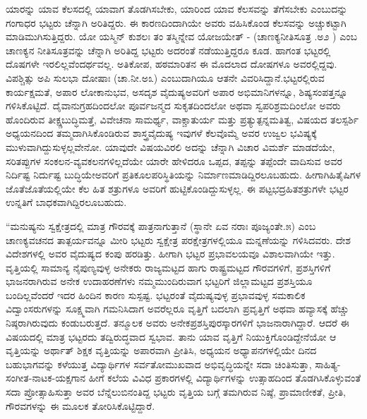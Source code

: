 {ಯಾರನ್ನು ಯಾವ ಕೆಲಸದಲ್ಲಿ ಯಾವಾಗ ತೊಡಗಿಸಬೇಕು, ಯಾರಿಂದ ಯಾವ ಕೆಲಸವನ್ನು ತೆಗೆಸಬೇಕು  ಎಂಬುದನ್ನು ಗಂಗಾಧರ ಭಟ್ಟರು ಚೆನ್ನಾಗಿ ಅರಿತಿದ್ದರು. ಈ ಕಾರಣದಿಂದಾಗಿಯೇ ಅವರು ವಹಿಸಿಕೊಂಡ ಕೆಲಸವನ್ನು ಅಚ್ಚುಕಟ್ಟಾಗಿ ಮಾಡಿಮುಗಿಸುತ್ತಿದ್ದರು. ಯೋ ಯಸ್ಮಿನ್ ಕುಶಲಃ ತಂ ತಸ್ಮಿನ್ನೇವ ಯೋಜಯೇತ್ - (ಚಾಣಕ್ಯನೀತಿಸೂತ್ರ .ಅ\enginline{-}೨ ) ಎಂಬ ಚಾಣಕ್ಯನ ನೀತಿಸೂತ್ರವನ್ನು ಚೆನ್ನಾಗಿ ಅರಿತಿದ್ದ ಭಟ್ಟರು ಅದರಂತೆ  ನಡೆಯುತ್ತಿದ್ದರೂ ಕೂಡ. ಹಾಗಂತ ಭಟ್ಟರಲ್ಲಿ ದೊಷಗಳೇ ಇರಲಿಲ್ಲವೆಂದರ್ಥವಲ್ಲ. ಅತಿಕೋಪ, ಹಠಮಾರಿತನ ಈ ಮೊದಲಾದ ದೋಷಗಳೂ ಅವರಲ್ಲಿದ್ದವು. ವಿಪಶ್ಚಿತ್ಸು ಅಪಿ ಸುಲಭಾ ದೋಷಾಃ (ಚಾ.ನೀ.\enginline{-}ಅ\enginline{-}೩) ಎಂಬುದಾಗಿಯೂ ಆತನೇ ವಿವರಿಸಿದ್ದಾನೆ.\break ಭಟ್ಟರಲ್ಲಿರುವ ಕಾರ್ಯಕ್ಷಮತೆ, ಅಪಾರ ಲೋಕಾನುಭವ, ಅಸದೃಶ ವೈದುಷ್ಯ\break ಅವರಿಗೆ ಅಪಾರ ಅಭಿಮಾನಿಗಳನ್ನೂ, ಶಿಷ್ಯಸಂಪತ್ತನ್ನೂ ಗಳಿಸಿಕೊಟ್ಟಿದೆ. ದೈವಾನುಗ್ರಹ\-ದಿಂದಲೋ  ಪೂರ್ವಜನ್ಮದ ಸುಕೃತದಿಂದಲೋ ಅಥವಾ ಸ್ವಪರಿಶ್ರಮದಿಂಲೋ ಅವರು ಹೊಂದಿರುವ ತೀಕ್ಷ್ಣಬುದ್ಧಿಮತ್ತೆ, ವಿವೇಚನಾ ಸಾಮರ್ಥ್ಯ, ವಾಕ್ಚಾತುರ್ಯ ಮತ್ತು ಪ್ರತ್ಯುತ್ಪನ್ನಮತಿತ್ವ, ವಿಷಯದ ತಲಸ್ಪರ್ಶಿ ಅಧ್ಯಯನದಿಂದ ತಮ್ಮದಾಗಿಸಿಕೊಂಡಿರುವ ಶಾಸ್ತ್ರವೈದುಷ್ಯ ಇವುಗಳೆ ಕೆಲವೊಮ್ಮೆ ಅವರ ಉಜ್ವಲ ಭವಿಷ್ಯಕ್ಕೆ ಮುಳುವಾಗಿದ್ದು\break ಸುಳ್ಳಲ್ಲವೇನೋ. ಯಾವುದೇ ವಿಷಯವಿರಲಿ ಅದನ್ನು ಚೆನ್ನಾಗಿ ವಿಚಾರ \enginline{-} ವಿಮರ್ಶೆ ಮಾಡದೆಯೇ, ಸರಿತಪ್ಪುಗಳ ಸಂಕಲನ-ವ್ಯವಕಲನಗಳಿಲ್ಲದೆಯೇ ಯಾರೇ ಹೇಳಿದರೂ ಒಪ್ಪದ, ತಪ್ಪನ್ನು ತಪ್ಪೆಂದೇ ವಾದಿಸುವ ಅವರ ನಿರ್ದಿಷ್ಟ \enginline{-} ನಿರ್ದುಷ್ಟ ಬುದ್ಧಿಯೇ\break ಅವರಿಗೆ ಪ್ರತಿಕೂಲ\-ಪರಿಸ್ಥಿತಿಯನ್ನು ನಿರ್ಮಾಣಮಾಡಿದ್ದಿರಲೂಬಹುದು. ಹೀಗಾಗಿ\break  ಹಿತೈಷಿಗಳ ಜೊತೆಜೊತೆಯಲ್ಲಿಯೇ ಕೆಲ ಹಿತ ಶತ್ರುಗಳೂ ಅವರಿಗೆ ಹುಟ್ಟಿಕೊಂಡಿದ್ದು\break ಸುಳ್ಳಲ್ಲ. ಈ ಪಟ್ಟಭದ್ರಹಿತಶತ್ರುಗಳೇ ಭಟ್ಟರ ಉನ್ನತಿಗೆ ಬಾಧಕವಾಗಿದ್ದಿರಲೂಬಹುದು. 

“ಮನುಷ್ಯನು ಸ್ವಕ್ಷೇತ್ರದಲ್ಲಿ ಮಾತ್ರ ಗೌರವಕ್ಕೆ ಪಾತ್ರನಾಗುತ್ತಾನೆ (ಸ್ಥಾನೇ ಏವ ನರಾಃ ಪೂಜ್ಯಂತೇ.\enginline{-}೫) ಎಂಬ ಚಾಣಕ್ಯವಚನದ ತಾತ್ಪರ್ಯವನ್ನೂ ಮೀರಿ ಭಟ್ಟರು ಸ್ವಕ್ಷೇತ್ರ ಪರಕ್ಷೇತ್ರಗಳಲ್ಲಿಯೂ ಮನ್ನಣೆಯನ್ನು ಗಳಿಸಿದವರು. ದೇಶ \enginline{-} ವಿದೇಶಗಳಲ್ಲಿ ಅವರ ವೈದುಷ್ಯದ ಕಂಪು ಹರಡಿತ್ತು. ಹೀಗಾಗಿ ಭಟ್ಟರ ಪ್ರಭಾವಲಯವೂ ವಿಶಾಲ\-ವಾಗಿಯೇ ಇತ್ತು. ವೃತ್ತಿಯಲ್ಲಿ ಸಾಮಾನ್ಯ ನೈಪುಣ್ಯವುಳ್ಳ ಅನೇಕರು ರಾಜ್ಯಮಟ್ಟದ ಹಾಗು ರಾಷ್ಟ್ರಮಟ್ಟದ ಗೌರವಗಳಿಗೆ, ಪ್ರಶಸ್ತಿಗಳಿಗೆ ಭಾಜನರಾಗಿರುವ ಅನೇಕ ಉದಾಹರಣೆಗಳು ನಮ್ಮ\break ಮುಂದಿರುವಾಗ ಭಟ್ಟರಿಗೆ ಜಿಲ್ಲಾಮಟ್ಟದ ಪ್ರಶಸ್ತಿಯೂ ಬಂದಿಲ್ಲವೆಂದರೆ ಇದರ ಹಿಂದಿನ ಕಾರಣ ಸುಸ್ಪಷ್ಟ. ಭಟ್ಟರಂತೆ ವೈದುಷ್ಯವುಳ್ಳ ಪ್ರಭಾವವುಳ್ಳ ಸಮಕಾಲಿಕ ವಿದ್ವಾಂಸರು\-ಗಳನ್ನು ಸೂಕ್ಷ್ಮವಾಗಿ ಗಮನಿಸಿದಾಗ ಅವರೆಲ್ಲರೂ ವೃತ್ತಿಗೆ ಬದಲಾಗಿ ಪ್ರವೃತ್ತಿಗೆ ಅಥವಾ ಹವ್ಯಾಸಕ್ಕೆ ಹೆಚ್ಚು ನಿಷ್ಠರಾಗಿರುವುದು ಕಂಡುಬರುತ್ತದೆ. ತನ್ಮೂಲಕ ಅವರು ಅನೇಕ\break ಪ್ರಶಸ್ತಿ\enginline{-}ಪುರಸ್ಕಾರಗಳಿಗೆ ಭಾಜನಾರಾಗಿದ್ದಾರೆ. ಆದರೆ ಈ ವಿಷಯದಲ್ಲಿ ಮಾತ್ರ ಭಟ್ಟರದು ತದ್ವಿರುದ್ಧವಾದ ಸ್ವಭಾವ. ತಾನು ಯಾವ ವೃತ್ತಿಗೆ ನಿಯುಕ್ತಿಗೊಂಡಿದ್ದೇನೆಯೋ ಆ ವೃತ್ತಿಯನ್ನು ಅರ್ಥಾತ್ ಶಿಕ್ಷಕ ವೃತ್ತಿಯನ್ನು ಅಪಾರವಾಗಿ ಪ್ರೀತಿಸಿ, ಅಧ್ಯಯನ ಅಧ್ಯಾಪನ\-ಗಳಲ್ಲಿಯೇ ದಿನದ ಬಹುಭಾಗವನ್ನು ಕಳೆಯುತ್ತ ವಿದ್ಯಾರ್ಥಿಗಳ ಸರ್ವತೋಮುಖವಾದ ಅಭಿವೃದ್ಧಿಯನ್ನೇ ಸದಾ ಚಿಂತಿಸುತ್ತಾ, ಸಾಹಿತ್ಯ-ಸಂಗೀತ-ನಾಟಕ-ಯಕ್ಷಗಾನ ಹೀಗೆ ಕಲೆಯ ವಿವಿಧ ಪ್ರಕಾರಗಳಲ್ಲಿ ವಿದ್ಯಾರ್ಥಿಗಳನ್ನು ಉತ್ಸಾಹದಿಂದ ತೊಡಗಿಸಿಕೊಳ್ಳುವಂತೆ ಸದಾ ಪ್ರೋತ್ಸಾಹಿಸುತ್ತಾ ಅವರ ಬೆನ್ನೆಲುಬಿನಂತಿದ್ದ ಭಟ್ಟರು ವೃತ್ತಿಯ ಬಗ್ಗೆ ತಮಗಿರುವ ನಿಷ್ಠೆ, ಪ್ರಾಮಾಣೀಕತೆ, ಪ್ರೀತಿ, ಗೌರವಗಳನ್ನು ಈ ಮೂಲಕ ತೋರಿಸಿಕೊಟ್ಟಿದ್ದಾರೆ.

}
